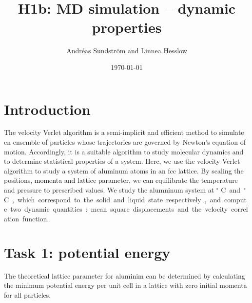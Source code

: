 
\usepackage{units}
\usepackage{physics}

\newcommand{\ee}{\mathrm{e}}
\newcommand{\ii}{\mathrm{i}}

\title{H1b: MD simulation -- dynamic properties}
\author{Andr\'eas Sundstr\"om and Linnea Hesslow}
\date{\today}





\section*{Introduction}

The velocity Verlet algorithm is a semi-implicit and efficient method to simulate en ensemble of particles whose trajectories are governed by Newton's equation of motion. Accordingly, 
it is a suitable algorithm to study molecular dynamics and to determine statistical properties of a system. Here, we use the velocity Verlet algorithm to study a system of aluminum atoms in an fcc lattice. By scaling the positions, momenta and lattice parameter, we can equilibrate the temperature and pressure to prescribed values. We  study the alumninum system at \unit[500]{$^\circ$ C} and \unit[700]{$^\circ$ C}, which correspond to the solid and liquid state respectively, and compute two dynamic quantities:   
mean square displacements and the velocity correlation function. 



\section*{Task 1: potential energy}
The theoretical lattice parameter for aluminim can be determined by calculating the minimum potential energy per unit cell in a lattice with zero initial momenta for all particles. 

